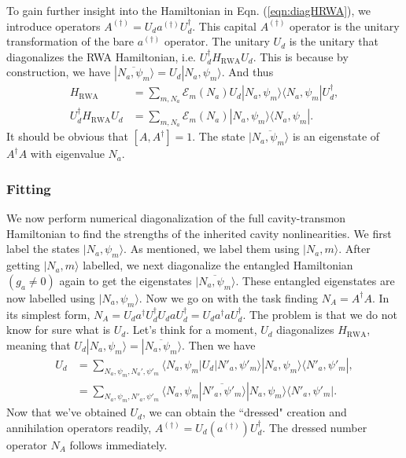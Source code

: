 \documentclass{article}
\begin{document}
To gain further insight into the Hamiltonian in Eqn. (\ref{eqn:diagHRWA}), we introduce operators $A^{(\dagger)} = U_d a^{(\dagger)}U_d^\dagger$. This capital $A^{(\dagger)}$ operator is the unitary transformation of the bare $a^{(\dagger)}$ operator. The unitary $U_d$ is the unitary that diagonalizes the RWA Hamiltonian, i.e. $U_d^\dagger H_{\text{RWA}}U_d$. This is because by construction, we have $|\overline{N_a,\psi_m}\rangle=U_d|N_a,\psi_m\rangle$. And thus
\begin{align}
    H_{\text{RWA}}&=\sum_{m, N_a}\mathcal{E}_m(N_a)U_d|N_a,\psi_m\rangle\langle N_a, \psi_m|U_d^\dagger,\\
    U_d^\dagger H_{\text{RWA}} U_d &= \sum_{m,N_a}\mathcal{E}_m(N_a)|N_a,\psi_m\rangle\langle N_a,\psi_m|.
\end{align}
It should be obvious that $[A, A^\dagger]=1$. The state $|\overline{N_a,\psi_m\rangle}$ is an eigenstate of $A^\dagger A$ with eigenvalue $N_a$. 

\subsubsection{Fitting}

We now perform numerical diagonalization of the full cavity-transmon Hamiltonian to find the strengths of the inherited cavity nonlinearities. We first label the states $|N_a,\psi_m\rangle$. As mentioned, we label them using $|N_a, m\rangle$. After getting $|N_a, m\rangle$ labelled, we next diagonalize the entangled Hamiltonian $(g_a\neq 0)$ again to get the eigenstates $|\overline{N_a,\psi_m}\rangle$. These entangled eigenstates are now labelled using $|N_a,\psi_m\rangle$. Now we go on with the task finding $N_A=A^\dagger A$. In its simplest form, $N_A=U_d a^\dagger U_d^\dagger U_d a U_d^\dagger= U_d a^\dagger a U_d^\dagger$. The problem is that we do not know for sure what is $U_d$. Let's think for a moment, $U_d$ diagonalizes $H_{\text{RWA}}$, meaning that $U_d|N_a,\psi_m\rangle=|\overline{N_a, \psi_m}\rangle$. Then we have
\begin{align}
    U_d &= \sum_{N_a, \psi_m, N_a', \psi'_m} \langle N_a, \psi_m | U_d | N'_a, \psi'_m\rangle|N_a,\psi_m\rangle\langle N'_a, \psi'_m|,\\
    & = \sum_{N_a, \psi_m, N'_a, \psi'_m} \langle N_a, \psi_m | \overline{N'_a, \psi'_m}\rangle |N_a,\psi_m\rangle\langle N'_a, \psi'_m|.
\end{align}
Now that we've obtained $U_d$, we can obtain the ``dressed" creation and annihilation operators readily, $A^{(\dagger)}=U_d(a^{(\dagger)})U_d^\dagger$. The dressed number operator $N_A$ follows immediately. 
\end{document}
